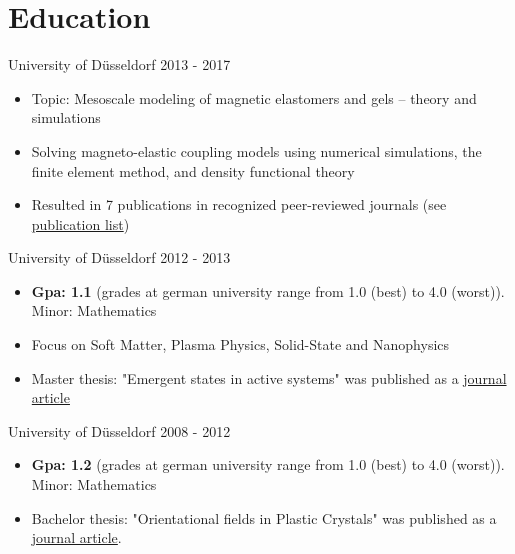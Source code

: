 \documentclass[singlesided,
               paper=a4,
               fontsize=10pt
              ]{my-resume}
\begin{document}
\section[\faMortarBoard]{Education}
    {University of Düsseldorf}
    {2013 - 2017}
    {
        \begin{itemize}[leftmargin=2em]
            \item Topic: Mesoscale modeling of magnetic elastomers and gels -- theory and simulations
            \item Solving magneto-elastic coupling models using numerical simulations, the finite element method, and density functional theory
            \item Resulted in 7 publications in recognized peer-reviewed journals (see \href{https://scholar.google.com/citations?hl=de&user=MnU8ZxwAAAAJ}{publication list})
        \end{itemize}
    }
%
    {University of Düsseldorf}
    {2012 - 2013}
    {
        \begin{itemize}[leftmargin=2em]
            \item \textbf{Gpa: 1.1} (grades at german university range from 1.0 (best) to 4.0 (worst)). Minor: Mathematics
            \item Focus on Soft Matter, Plasma Physics, Solid-State and Nanophysics
            \item Master thesis: "Emergent states in active systems" was published as a \href{https://journals.aps.org/pre/abstract/10.1103/PhysRevE.89.022307}{journal article}
        \end{itemize}
    }
%
    {University of Düsseldorf}
    {2008 - 2012}
    {
        \begin{itemize}[leftmargin=2em]
            \item \textbf{Gpa: 1.2} (grades at german university range from 1.0 (best) to 4.0 (worst)). Minor: Mathematics
            \item Bachelor thesis: "Orientational fields in Plastic Crystals" was published as a \href{https://epljournal.edpsciences.org/articles/epl/abs/2012/15/epl14756/epl14756.html}{journal article}.
        \end{itemize}
    }
\end{document}
